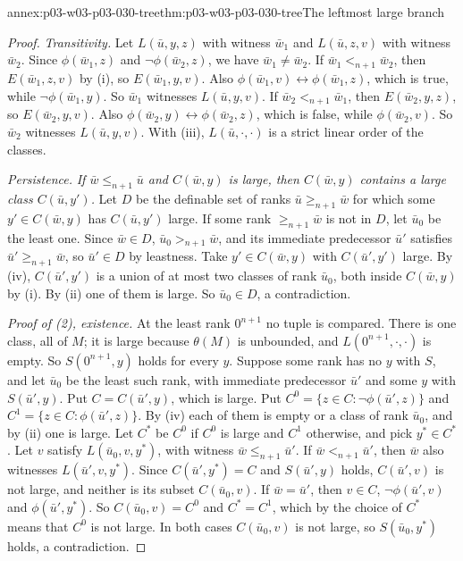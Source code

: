 \begin{annexitem}{annex:p03-w03-p03-030-tree}{thm:p03-w03-p03-030-tree}{The leftmost large branch}
\begin{proof}
\emph{Transitivity.}  Let \(L(\bar u,y,z)\) with witness \(\bar w_1\) and
\(L(\bar u,z,v)\) with witness \(\bar w_2\).  Since \(\phi(\bar w_1,z)\) and
\(\neg\phi(\bar w_2,z)\), we have \(\bar w_1\ne\bar w_2\).  If \(\bar
w_1<_{n+1}\bar w_2\), then \(E(\bar w_1,z,v)\) by (i), so \(E(\bar
w_1,y,v)\).  Also \(\phi(\bar w_1,v)\leftrightarrow\phi(\bar w_1,z)\), which
is true, while \(\neg\phi(\bar w_1,y)\).  So \(\bar w_1\) witnesses \(L(\bar
u,y,v)\).  If \(\bar w_2<_{n+1}\bar w_1\), then \(E(\bar w_2,y,z)\), so
\(E(\bar w_2,y,v)\).  Also \(\phi(\bar w_2,y)\leftrightarrow\phi(\bar
w_2,z)\), which is false, while \(\phi(\bar w_2,v)\).  So \(\bar w_2\)
witnesses \(L(\bar u,y,v)\).  With (iii), \(L(\bar u,\cdot,\cdot)\) is a strict
linear order of the classes.

\emph{Persistence.}  \emph{If \(\bar w\le_{n+1}\bar u\) and \(C(\bar w,y)\) is
large, then \(C(\bar w,y)\) contains a large class \(C(\bar u,y')\).}  Let
\(D\) be the definable set of ranks \(\bar u\ge_{n+1}\bar w\) for which some
\(y'\in C(\bar w,y)\) has \(C(\bar u,y')\) large.  If some rank
\(\ge_{n+1}\bar w\) is not in \(D\), let \(\bar u_0\) be the least one.
Since \(\bar w\in D\), \(\bar u_0>_{n+1}\bar w\), and its immediate
predecessor \(\bar u'\) satisfies \(\bar u'\ge_{n+1}\bar w\), so
\(\bar u'\in D\) by leastness.  Take \(y'\in C(\bar w,y)\) with
\(C(\bar u',y')\) large.  By (iv), \(C(\bar u',y')\) is a union of at most two
classes of rank \(\bar u_0\), both inside \(C(\bar w,y)\) by (i).  By (ii)
one of them is large.  So \(\bar u_0\in D\), a contradiction.

\emph{Proof of (2), existence.}  At the least rank \(0^{n+1}\) no tuple is
compared.  There is one class, all of \(M\); it is large because
\(\theta(M)\) is unbounded, and \(L(0^{n+1},\cdot,\cdot)\) is empty.  So
\(S(0^{n+1},y)\) holds for every \(y\).  Suppose some rank has no \(y\) with
\(S\), and let \(\bar u_0\) be the least such rank, with immediate
predecessor \(\bar u'\) and some \(y\) with \(S(\bar u',y)\).  Put
\(C=C(\bar u',y)\), which is large.  Put
\(C^0=\{z\in C:\neg\phi(\bar u',z)\}\) and
\(C^1=\{z\in C:\phi(\bar u',z)\}\).  By (iv) each of them is empty or a class
of rank \(\bar u_0\), and by (ii) one is large.  Let \(C^*\) be \(C^0\) if
\(C^0\) is large and \(C^1\) otherwise, and pick \(y^*\in C^*\).  Let \(v\)
satisfy \(L(\bar u_0,v,y^*)\), with witness \(\bar w\le_{n+1}\bar u'\).  If
\(\bar w<_{n+1}\bar u'\), then \(\bar w\) also witnesses \(L(\bar u',v,y^*)\).
Since \(C(\bar u',y^*)=C\) and \(S(\bar u',y)\) holds, \(C(\bar u',v)\) is not
large, and neither is its subset \(C(\bar u_0,v)\).  If \(\bar w=\bar u'\),
then \(v\in C\), \(\neg\phi(\bar u',v)\) and \(\phi(\bar u',y^*)\).  So
\(C(\bar u_0,v)=C^0\) and \(C^*=C^1\), which by the choice of \(C^*\) means that
\(C^0\) is not large.  In both cases \(C(\bar u_0,v)\) is not large, so
\(S(\bar u_0,y^*)\) holds, a contradiction.


\end{proof}
\end{annexitem}
